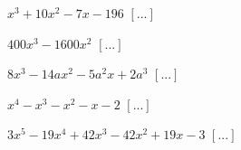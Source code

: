 \begin{esercizio}[\Ast]
\begin{multicols}{2}
\begin{enumeratea}
 \item~$ x^3+10x^2-7x-196 $ \hfill $\left[...\right]$
 \item~$ 400x^3-1600x^2$ \hfill $\left[...\right]$
 \item~$ 8x^3-14{ax}^2-5a^2x+2a^3 $ \hfill $\left[...\right]$
 \item~$ x^4-x^3-x^2-x-2 $ \hfill $\left[...\right]$
 \item~$ 3x^5-19x^4+42x^3-42x^2+19x-3 $ \hfill $\left[...\right]$
 \end{enumeratea}
 \end{multicols}
\end{esercizio}



